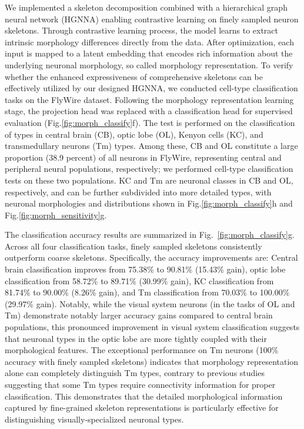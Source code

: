 \documentclass{article}
\begin{document}
We implemented a skeleton decomposition combined with a hierarchical graph neural network (HGNNA) enabling contrastive learning on finely sampled neuron skeletons. Through contrastive learning process, the model learns to extract intrinsic morphology differences directly from the data. After optimization, each input is mapped to a latent embedding that encodes rich information about the underlying neuronal morphology, so called morphology representation. 
To verify whether the enhanced expressiveness of comprehensive skeletons can be effectively utilized by our designed HGNNA, we conducted cell-type classification tasks on the FlyWire dataset. Following the morphology representation learning stage, the projection head was replaced with a classification head for supervised evaluation ({Fig.\ref{fig:morph_classify}f}). The test is performed on the classification of types in central brain (CB), optic lobe (OL), Kenyon cells (KC), and transmedullary neurons (Tm) types. Among these, CB and OL constitute a large proportion (38.9 percent) of all neurons in FlyWire, representing central and peripheral neural populations, respectively; we performed cell-type classification tests on these two populations. KC and Tm are neuronal classes in CB and OL, respectively, and can be further subdivided into more detailed types, with neuronal morphologies and distributions shown in {Fig.\ref{fig:morph_classify}h} and {Fig.\ref{fig:morph_sensitivity}g}. 


The classification accuracy results are summarized in {Fig.~\ref{fig:morph_classify}g}. Across all four classification tasks, finely sampled skeletons consistently outperform coarse skeletons. Specifically, the accuracy improvements are: Central brain classification improves from 75.38\% to 90.81\% (15.43\% gain), optic lobe classification from 58.72\% to 89.71\% (30.99\% gain), KC classification from 81.74\% to 90.00\% (8.26\% gain), and Tm classification from 70.03\% to 100.00\% (29.97\% gain). 
Notably, while the visual system neurons (in the tasks of OL and Tm) demonstrate notably larger accuracy gains compared to central brain populations, this pronounced improvement in visual system classification suggests that neuronal types in the optic lobe are more tightly coupled with their morphological features. The exceptional performance on Tm neurons (100\% accuracy with finely sampled skeletons) indicates that morphology representation alone can completely distinguish Tm types, contrary to previous studies suggesting that some Tm types require connectivity information for proper classification. This demonstrates that the detailed morphological information captured by fine-grained skeleton representations is particularly effective for distinguishing visually-specialized neuronal types.
\end{document}
